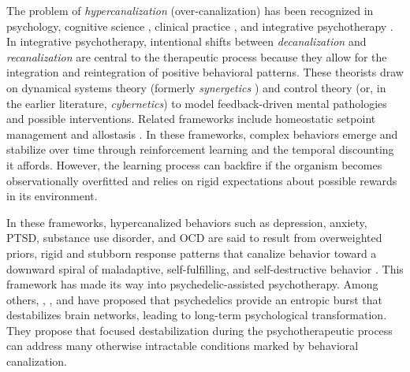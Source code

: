 \documentclass[12pt,fleqn]{article}
\begin{document}
The problem of \emph{hypercanalization} (over-canalization) has been recognized in psychology, cognitive science \cite{lloyd_understanding_2023}, clinical practice \cite{addicott_primer_2017}, and integrative psychotherapy \cite{schiepek_self-organization_2014, schiepek_integrative_2015, schiepek_psychotherapy_2017}. In integrative psychotherapy, intentional shifts between \emph{decanalization} and \emph{recanalization} are central to the therapeutic process because they allow for the integration and reintegration of positive behavioral patterns. These theorists draw on dynamical systems theory (formerly \emph{synergetics} \cite{haken_synergetics_1977}) and control theory \cite{wiener_cybernetics_2019} (or, in the earlier literature, \emph{cybernetics}) to model feedback-driven mental pathologies and possible interventions. Related frameworks include homeostatic setpoint management \cite{keramati_homeostatic_2014} and allostasis \cite{sterling_allostasis_1988, sterling_allostasis_2012}. In these frameworks, complex behaviors emerge and stabilize over time through reinforcement learning \cite{keramati_homeostatic_2014} and the temporal discounting it affords. However, the learning process can backfire if the organism becomes observationally overfitted and relies on rigid expectations about possible rewards in its environment.

In these frameworks, hypercanalized behaviors such as depression, anxiety, PTSD, substance use disorder, and OCD are said to result from overweighted priors, rigid and stubborn response patterns that canalize behavior toward a downward spiral of maladaptive, self-fulfilling, and self-destructive behavior \cite{scheffer_dynamical_2024}. This framework has made its way into psychedelic-assisted psychotherapy. Among others, \cite{carhart-harris_entropic_2014}, \cite{hipolito_pattern_2023}, and \cite{girn_complex_2023} have proposed that psychedelics provide an entropic burst that destabilizes brain networks, leading to long-term psychological transformation. They propose that focused destabilization during the psychotherapeutic process can address many otherwise intractable conditions marked by behavioral canalization.
\end{document}
